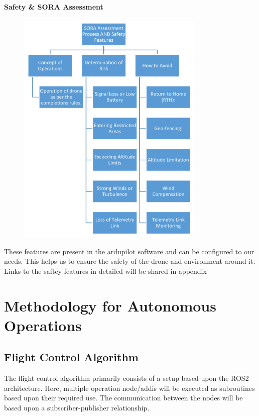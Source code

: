 \documentclass[12pt]{report}
\begin{document}
  \subsubsection{\LARGE Safety \& SORA Assessment} 
  \begin{figure}[H]
    \begin{center}
      \includegraphics[width=0.8\textwidth]{sora.png}
    \end{center}
    \caption{}\label{fig:sora}
  \end{figure}

  These features are present in the ardupilot software and can be configured to our needs.
This helps us to ensure the safety of the drone and environment around it.
Links to the saftey features in detailed will be shared in appendix
  
      
  \chapter{Methodology for Autonomous Operations}
    \section{Flight Control Algorithm}
    The flight control algorithm primarily consists of a setup based upon the ROS2 architecture. Here, multiple operation node/addis will be executed as subroutines based upon their required use. The communication between the nodes will be based upon a subscriber-publisher relationship.\\
\end{document}
